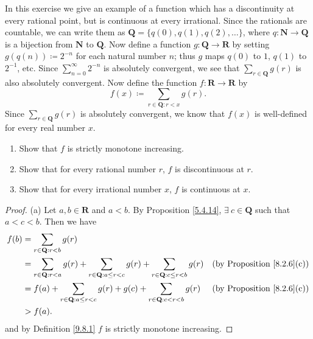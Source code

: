 \begin{exercise}\label{ex 9.8.5}
    In this exercise we give an example of a function which has a discontinuity at every rational point, but is continuous at every irrational.
    Since the rationals are countable, we can write them as \(\mathbf{Q} = \{q(0), q(1), q(2), \dots\}\), where \(q : \mathbf{N} \to \mathbf{Q}\) is a bijection from \(\mathbf{N}\) to \(\mathbf{Q}\).
    Now define a function \(g : \mathbf{Q} \to \mathbf{R}\) by setting \(g(q(n)) \coloneqq 2^{-n}\) for each natural number \(n\);
    thus \(g\) maps \(q(0)\) to \(1\), \(q(1)\) to \(2^{-1}\), etc.
    Since \(\sum_{n = 0}^\infty 2^{-n}\) is absolutely convergent, we see that \(\sum_{r \in \mathbf{Q}} g(r)\) is also absolutely convergent.
    Now define the function \(f : \mathbf{R} \to \mathbf{R}\) by
    \[
        f(x) \coloneqq \sum_{r \in \mathbf{Q} : r < x} g(r).
    \]
    Since \(\sum_{r \in \mathbf{Q}} g(r)\) is absolutely convergent, we know that \(f(x)\) is well-defined for every real number \(x\).
    \begin{enumerate}
        \item Show that \(f\) is strictly monotone increasing.
        \item Show that for every rational number \(r\), \(f\) is discontinuous at \(r\).
        \item Show that for every irrational number \(x\), \(f\) is continuous at \(x\).
    \end{enumerate}
\end{exercise}

\begin{proof}{(a)}
    Let \(a, b \in \mathbf{R}\) and \(a < b\).
    By Proposition \ref{5.4.14}, \(\exists\ c \in \mathbf{Q}\) such that \(a < c < b\).
    Then we have
    \begin{align*}
        f(b) & = \sum_{r \in \mathbf{Q} : r < b} g(r)                                                                                                                                      \\
             & = \sum_{r \in \mathbf{Q} : r < a} g(r) + \sum_{r \in \mathbf{Q} : a \leq r < c} g(r) + \sum_{r \in \mathbf{Q} : c \leq r < b} g(r) & \text{(by Proposition \ref{8.2.6}(c))} \\
             & = f(a) + \sum_{r \in \mathbf{Q} : a \leq r < c} g(r) + g(c) + \sum_{r \in \mathbf{Q} : c < r < b} g(r)                             & \text{(by Proposition \ref{8.2.6}(c))} \\
             & > f(a).
    \end{align*}
    and by Definition \ref{9.8.1} \(f\) is strictly monotone increasing.
\end{proof}


